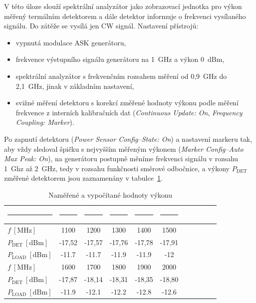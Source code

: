 \documentclass[11pt,a4paper]{article}
\begin{document}
V této úloze slouží spektrální analyzátor jako zobrazovací jednotka pro výkon měřený termálním detektorem a dále detektor informuje o frekvenci vysílaného signálu. Do zátěže se vysílá jen CW signál. Nastavení přístrojů:
\begin{itemize}
    \item vypnutá modulace ASK generátoru,
    \item frekvence výstupního signálu generátoru na 1~GHz a výkon 0~dBm,
    \item spektrální analyzátor s frekvenčním rozsahem měření od 0,9~GHz do 2,1~GHz, jinak v základním nastavení,
    \item svižné měření detektoru s korekcí změřené hodnoty výkonu podle měření frekvence z interních kalibračních dat (\emph{Continuous Update: On}, \emph{Frequency Coupling: Marker}).
\end{itemize}
Po zapnutí detektoru (\emph{Power Sensor Config--State: On}) a nastavení markeru tak, aby vždy sledoval špičku s nejvyšším měřeným výkonem (\emph{Marker Config--Auto Max Peak: On}), na generátoru postupně měníme frekvenci signálu v rozsahu 1~Ghz až 2~GHz, tedy v rozsahu funkčnosti směrové odbočnice, a výkony $P_{\mathrm{DET}}$ změřené detektorem jsou zaznamenány v tabulce~\ref{table:task2-data}.
\begin{table}[!ht]
    \centering
    \begin{tabular}{|l||c|c|c|c|c|c|c|c|c|c|}
        \rule{2cm}{0pt} & \rule{1.5cm}{0pt} & \rule{1.5cm}{0pt} & \rule{1.5cm}{0pt} & \rule{1.5cm}{0pt} & \rule{1.5cm}{0pt}\\[-\arraystretch\normalbaselineskip]
        \hline
        $f\ [\mathrm{MHz}]$ & 1100 & 1200 & 1300 & 1400 & 1500\\
        \hline
        $P_{\mathrm{DET}} \ [\mathrm{dBm}]$ & -17,52 & -17,57 & -17,76 & -17,78 & -17,91\\
        \hline
        $P_{\mathrm{LOAD}} \ [\mathrm{dBm}]$ & -11.7 & -11.7 & -11.9 & -11.9 & -12\\
        \hline\hline
        $f\ [\mathrm{MHz}]$ & 1600 & 1700 & 1800 & 1900 & 2000\\
        \hline
        $P_{\mathrm{DET}} \ [\mathrm{dBm}]$ & -17,87 & -18,14 & -18,31 & -18,35 & -18,80\\
        \hline
        $P_{\mathrm{LOAD}} \ [\mathrm{dBm}]$ & -11.9 & -12.1 & -12.2 & -12.8 & -12.6\\
        \hline
    \end{tabular}
    \caption{Naměřené a vypočítané hodnoty výkonu}
    \label{table:task2-data}
\end{table}
\end{document}
